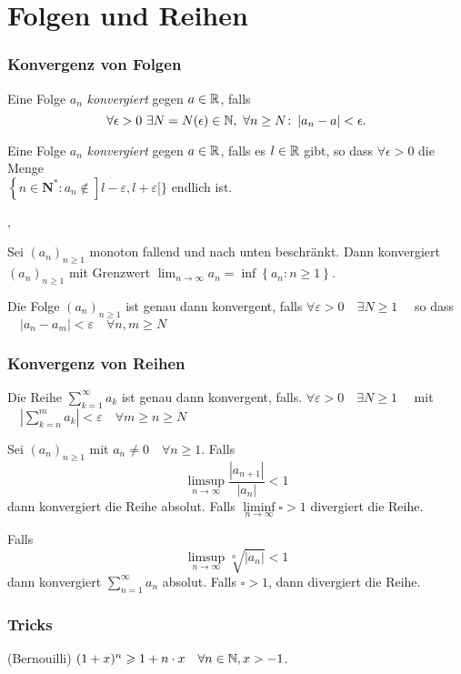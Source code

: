 \part{Folgen und Reihen}

\section{Konvergenz von Folgen}

\Def Eine Folge $a_n$ \emph{konvergiert} gegen $a\in \mathbb{R}$, falls
\[
\forall \epsilon > 0 \ \exists N=N(\epsilon)\in\mathbb{N}, \ \forall n\geq
N \colon \left\lvert a_n-a \right\rvert < \epsilon.
\]

\Def Eine Folge $a_n$ \emph{konvergiert} gegen $a\in \mathbb{R}$, falls es $l \in \mathbb{R}$ gibt, so dass $\forall \epsilon > 0$ die Menge \\
$
\left\{n \in \mathbf{N}^{*}: a_{n} \notin\right] l-\varepsilon, l+\varepsilon[\}
$ endlich ist.

\sep

\Satz[Monotone] Sei $\left(a_{n}\right)_{n \geqslant 1}$ monoton fallend und nach unten beschränkt. Dann konvergiert
$\left(a_{n}\right)_{n \geqslant 1}$ mit Grenzwert
$
\lim _{n \rightarrow \infty} a_{n}=\inf \left\{a_{n}: n \geqslant 1\right\}
$.

\Satz[Cauchy] Die Folge $\left(a_{n}\right)_{n \geqslant 1}$ ist genau dann konvergent, falls $\forall \varepsilon>0 \quad \exists N \geqslant 1 \quad$ so dass $\quad\left|a_{n}-a_{m}\right|<\varepsilon \quad \forall n, m \geqslant N$


\section{Konvergenz von Reihen}

\Satz[Cauchy] Die Reihe $\sum_{k=1}^{\infty} a_{k}$ ist genau dann konvergent, falls. $\forall \varepsilon>0 \quad \exists N \geqslant 1 \quad$ mit $\quad\left|\sum\limits_{k=n}^{m} a_{k}\right|<\varepsilon \quad \forall m \geqslant n \geqslant N$

\Satz[Ratio] Sei $\left(a_{n}\right)_{n \geqslant 1}$ mit $a_{n} \neq 0 \quad \forall n \geqslant 1 .$ Falls 
$$\limsup\limits_{n \rightarrow \infty} \frac{\left|a_{n+1}\right|}{\left|a_{n}\right|}<1$$ dann konvergiert die Reihe absolut.
Falls $\liminf\limits_{n \rightarrow \infty}\square > 1$ divergiert die Reihe.

\Satz[Root] Falls $$\limsup\limits_{n \rightarrow \infty} \sqrt[n]{\left|a_{n}\right|}<1$$ dann konvergiert $\sum_{n=1}^{\infty} a_{n}$ absolut. Falls $\square > 1$, dann divergiert die Reihe.


\section{Tricks}
\Lemma (Bernouilli) $(1+x)^{n} \geqslant 1+n \cdot x \quad \forall n \in \mathbb{N}, x>-1$.
